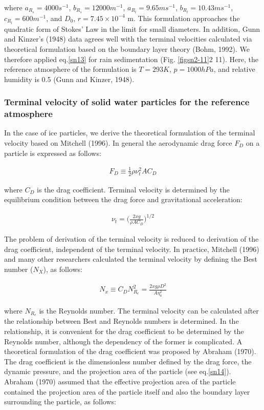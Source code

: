 where $a_{R_{s}}= 4000 s^{-1}$, $b_{R_{s}}=12000 m^{-1}$, $a_{R_{l}}=9.65 m s^{-1}$, $b_{R_{l}} = 10.43 m s^{-1}$, $c_{R_{l}} = 600 m^{-1}$, and $D_{0}$, $r=7.45\times10^{-4}$ m. This formulation approaches the quadratic form of Stokes’ Law in the limit for small diameters. In addition, Gunn and Kinzer’s (1948) data agrees well with the terminal velocities calculated via theoretical formulation based on the boundary layer theory (Bohm, 1992). We therefore applied eq.\ref{sn13} for rain sedimentation (Fig. \ref{figsn2-11}2 11). Here, the reference atmosphere of the formulation is $T = 293 K$, $p = 1000hPa$, and relative humidity is 0.5 (Gunn and Kinzer, 1948).

\subsubsection{Terminal velocity of solid water particles for the reference atmosphere}
In the case of ice particles, we derive the theoretical formulation of the terminal velocity based on Mitchell (1996). In general the aerodynamic drag force $F_{D}$ on a particle is expressed as follows:

\begin{eqnarray}
F_{D}\equiv \frac{1}{2}\rho\nu_{t}^{2}AC_{D}
\label{sn14}
\end{eqnarray}

where $C_{D}$ is the drag coefficient. Terminal velocity is determined by the equilibrium condition between the drag force and gravitational acceleration:

\begin{eqnarray}
\nu_{t}=\bigl(\frac{2xg}{\rho AC_{D}}\bigr)^{1/2}
\label{sn15}
\end{eqnarray}

The problem of derivation of the terminal velocity is reduced to derivation of the drag coefficient, independent of the terminal velocity. In practice, Mitchell (1996) and many other researchers calculated the terminal velocity by defining the Best number ($N_{X}$), as follows:

\begin{eqnarray}
N_{x}\equiv C_{D}N_{R_{e}}^{2}=\frac{2xg\rho D^{2}}{A\eta_{a}^{2}}
\label{sn16}
\end{eqnarray}

where $N_{R_{e}}$ is the Reynolds number. The terminal velocity can be calculated after the relationship between Best and Reynolds numbers is determined. In the relationship, it is convenient for the drag coefficient to be determined by the Reynolds number, although the dependency of the former is complicated. A theoretical formulation of the drag coefficient was proposed by Abraham (1970). The drag coefficient is the dimensionless number defined by the drag force, the dynamic pressure, and the projection area of the particle (see eq.\ref{sn14}). Abraham (1970) assumed that the effective projection area of the particle contained the projection area of the particle itself and also the boundary layer surrounding the particle, as follows:


